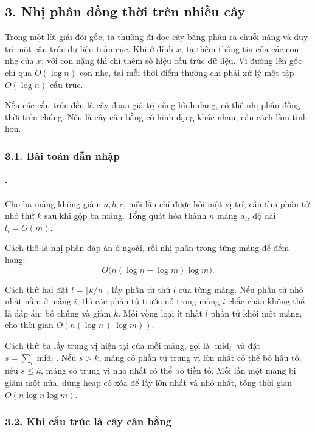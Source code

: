 \documentclass[11pt]{article}
\begin{document}
\subsection*{3. Nhị phân đồng thời trên nhiều cây}

Trong một lời giải đổi gốc, ta thường đi dọc cây bằng phân rã chuỗi nặng và
duy trì một cấu trúc dữ liệu toàn cục. Khi ở đỉnh \(x\), ta thêm thông tin của
các con nhẹ của \(x\); với con nặng thì chỉ thêm số hiệu cấu trúc dữ liệu. Vì
đường lên gốc chỉ qua \(O(\log n)\) con nhẹ, tại mỗi thời điểm thường chỉ phải
xử lý một tập \(O(\log n)\) cấu trúc.

Nếu các cấu trúc đều là cây đoạn giá trị cùng hình dạng, có thể nhị phân đồng
thời trên chúng. Nếu là cây cân bằng có hình dạng khác nhau, cần cách làm tinh
hơn.

\subsubsection*{3.1. Bài toán dẫn nhập}

\paragraph{.}
Cho ba mảng không giảm \(a,b,c\), mỗi lần chỉ được hỏi một vị trí, cần tìm phần
tử nhỏ thứ \(k\) sau khi gộp ba mảng. Tổng quát hóa thành \(n\) mảng
\(a_i\), độ dài \(l_i=O(m)\).

Cách thô là nhị phân đáp án ở ngoài, rồi nhị phân trong từng mảng để đếm hạng:
\[
  O\bigl(n(\log n+\log m)\log m\bigr).
\]

Cách thứ hai đặt \(l=\lfloor k/n\rfloor\), lấy phần tử thứ \(l\) của từng
mảng. Nếu phần tử nhỏ nhất nằm ở mảng \(i\), thì các phần tử trước nó trong
mảng \(i\) chắc chắn không thể là đáp án; bỏ chúng và giảm \(k\). Mỗi vòng loại
ít nhất \(l\) phần tử khỏi một mảng, cho thời gian \(O(n(\log n+\log m))\).

Cách thứ ba lấy trung vị hiện tại của mỗi mảng, gọi là \(\operatorname{mid}_i\)
và đặt \(s=\sum_i \operatorname{mid}_i\). Nếu \(s>k\), mảng có phần tử trung vị
lớn nhất có thể bỏ hậu tố; nếu \(s\le k\), mảng có trung vị nhỏ nhất có thể bỏ
tiền tố. Mỗi lần một mảng bị giảm một nửa, dùng heap có xóa để lấy lớn nhất và
nhỏ nhất, tổng thời gian \(O(n\log n\log m)\).

\subsubsection*{3.2. Khi cấu trúc là cây cân bằng}
\end{document}
